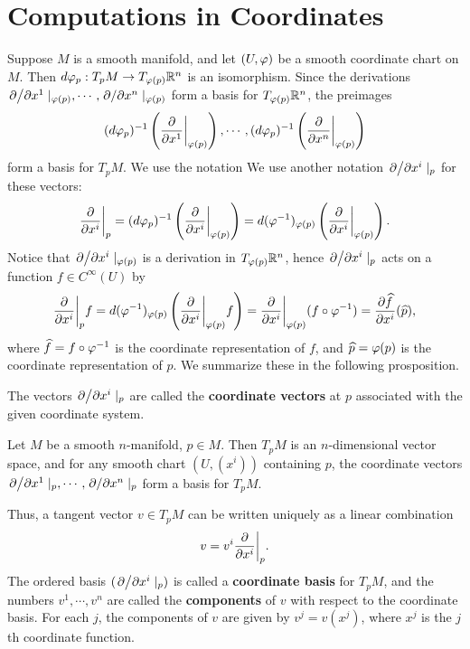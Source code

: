 \section{Computations in Coordinates}
Suppose $M$ is a smooth manifold, and let $(U,\varphi)$ be a smooth coordinate chart on $M$. Then $d\varphi_p: T_pM \to T_{\varphi(p)}\mathbb{R}^n$ is an isomorphism. Since the derivations 
$\pdv*{}{x^1}|_{\varphi(p)}, \cdots, \pdv*{}{x^n}|_{\varphi(p)}$ form a basis for $T_{\varphi(p)}\mathbb{R}^n$, the preimages 
$$ (d\varphi_p)^{-1}\left(\pdv{}{x^1}\bigg|_{\varphi(p)}\right), \cdots, (d\varphi_p)^{-1}\left(\pdv{}{x^n}\bigg|_{\varphi(p)}\right) $$
form a basis for $T_pM$. We use the notation 
We use another notation $\pdv*{}{x^i}|_p$ for these vectors:
\begin{equation}\label{tan_manifold_basis}
    \pdv{}{x^i}\bigg|_p = (d\varphi_p)^{-1}\left( {\pdv{}{x^i}}\bigg|_{\varphi(p)} \right)
  = d(\varphi^{-1})_{\varphi(p)}\left({\pdv{}{x^i}}\bigg|_{\varphi(p)}\right).
\end{equation}
Notice that $\pdv*{}{x^i}|_{\varphi(p)}$ is a derivation in $T_{\varphi(p)}\mathbb{R}^n$, 
hence $\pdv*{}{x^i}|_{p}$ acts on a function $f \in C^\infty(U)$ by 
\begin{equation}
    \pdv{}{x^i}\bigg|_p f = d(\varphi^{-1})_{\varphi(p)}\left(\pdv{}{x^i}\bigg|_{\varphi(p)}f \right)
    = \pdv{}{x^i}\bigg|_{\varphi(p)}(f \circ \varphi^{-1}) 
    = {\pdv{\widehat{f}}{x^i}}(\widehat{p}),
\end{equation}
where $\widehat{f} = f \circ \varphi^{-1}$ is the coordinate representation of $f$, and $\widehat{p} = \varphi(p)$ is the coordinate representation of $p$. We summarize these in the following prosposition. 
\begin{definition}
    The vectors $\pdv*{}{x^i}|_p$ are called the \textbf{coordinate vectors} at $p$ associated with the given coordinate system. 
\end{definition}
\begin{proposition}
    Let $M$ be a smooth $n$-manifold, $p \in M$. Then $T_pM$ is an $n$-dimensional vector space, and for any smooth chart $(U, (x^i))$ containing $p$, the coordinate vectors $\pdv*{}{x^1}|_p, \cdots, \pdv*{}{x^n}|_p$ form a basis for $T_pM$. 
\end{proposition}
Thus, a tangent vector $v \in T_pM$ can be written uniquely as a linear combination $$v = v^i \pdv{}{x^i}\bigg|_p.$$
The ordered basis $(\pdv*{}{x^i}|_p)$ is called a \textbf{coordinate basis} for $T_pM$, and the numbers $v^1, \cdots, v^n$ are called the \textbf{components} of $v$ with respect to the coordinate basis. For each $j$, the components of $v$ are given by $v^j = v(x^j)$, where $x^j$ is the $j$th coordinate function. 

